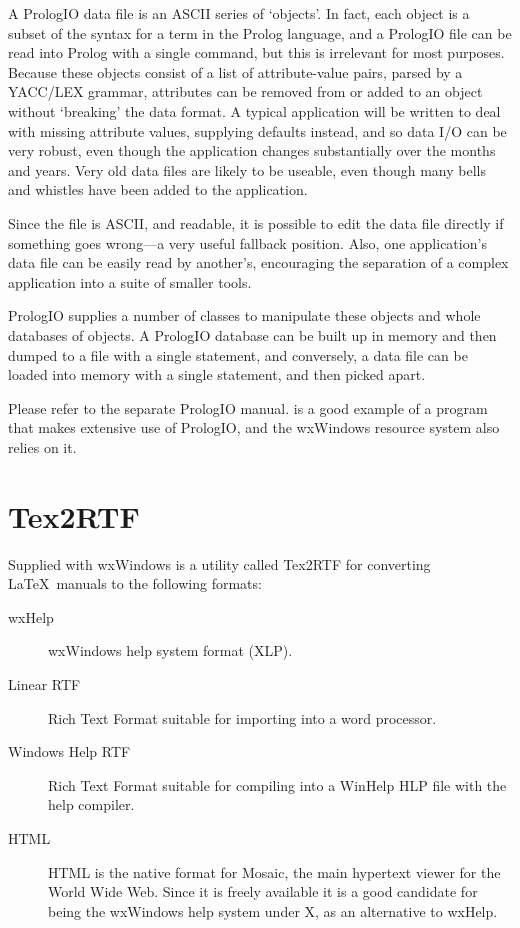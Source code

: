 A PrologIO data file is an ASCII series of `objects'. In fact, each
object is a subset of the syntax for a term in the Prolog language, and
a PrologIO file can be read into Prolog with a single command, but this
is irrelevant for most purposes. Because these objects consist of a list
of attribute-value pairs, parsed by a YACC/LEX grammar, attributes can
be removed from or added to an object without `breaking' the data
format. A typical application will be written to deal with missing
attribute values, supplying defaults instead, and so data I/O can be
very robust, even though the application changes substantially over the
months and years. Very old data files are likely to be useable, even
though many bells and whistles have been added to the application.

Since the file is ASCII, and readable, it is possible to edit the data
file directly if something goes wrong---a very useful fallback position.
Also, one application's data file can be easily read by another's,
encouraging the separation of a complex application into a suite of
smaller tools.

PrologIO supplies a number of classes to manipulate these objects and
whole databases of objects. A PrologIO database can be built up
in memory and then dumped to a file with a single statement, and
conversely, a data file can be loaded into memory with a single
statement, and then picked apart.

Please refer to the separate PrologIO manual.  is
a good example of a program that makes extensive use of PrologIO, and the
wxWindows resource system also relies on it.


\section{Tex2RTF}\label{textortf}

Supplied with wxWindows is a utility called Tex2RTF for converting\rtfsp
\LaTeX\ manuals to the following formats:

\begin{description}
\item[wxHelp]
wxWindows help system format (XLP).
\item[Linear RTF]
Rich Text Format suitable for importing into a word processor.
\item[Windows Help RTF]
Rich Text Format suitable for compiling into a WinHelp HLP file with the
help compiler.
\item[HTML]
HTML is the native format for Mosaic, the main hypertext viewer for
the World Wide Web. Since it is freely available it is a good candidate
for being the wxWindows help system under X, as an alternative to wxHelp.
\end{description}

